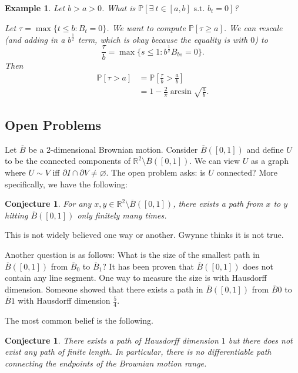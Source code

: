 \documentclass{tufte-handout}
\newcommand*\R{\mathbb{R}}
\renewcommand*\P{\mathbb{P}}
\let\O\varnothing
\newtheorem{conj}[thm]{Conjecture}
\newtheorem{ex}[thm]{Example}
\theoremstyle{definition}
\begin{document}
\begin{ex}
	Let $b > a > 0$. What is $\P\left[\exists\ t \in [a,b] \text{ s.t. } b_t = 0\right] $?

	Let $\tau = \max \{t \le b : B_t = 0\}$. We want to compute $\P\left[\tau \ge a\right] $.
	We can rescale (and adding in a $b^{\frac{1}{2}}$ term, which is okay because the equality is with $0$) to \[
		\frac{\tau}{b} = \max \{ s \le 1 : b^{\frac{1}{2}} B_{bs} = 0\}
	.\] 
	Then 
	\begin{align*}
		\P\left[\tau > a\right] &= \P\left[\frac{\tau}{b} > \frac{a}{b}\right] \\
								&= 1-\frac{2}{\pi} \arcsin{\sqrt{\frac{a}{b}} }
	.\end{align*}
\end{ex}

\subsection{Open Problems}
Let $\overline{B}$ be a 2-dimensional Brownian motion.
Consider $\overline{B}([0,1])$ and define $U$ to be the connected components of $\R^2 \setminus \overline{B}([0,1])$. We can view $U$ as a graph where $U\sim V$ iff $\partial I \cap \partial V \ne \O$. The open problem asks: is $U$ connected? More specifically, we have the following:
\begin{conj}
	For any $x,y \in \R^2 \setminus \overline{B}\left( [0,1] \right)$, there exists a path from $x$ to $y$ hitting $\overline{B}\left( [0,1] \right)$ only finitely many times. 
\end{conj}
This is not widely believed one way or another. Gwynne thinks it is not true.


Another question is as follows: What is the size of the smallest path in $\overline{B}\left( [0,1] \right)$ from $\overline{B}_0$ to $\overline{B}_1$? It has been proven that $\overline{B}\left( [0,1] \right)$ does not contain any line segment. One way to measure the size is with Hausdorff dimension. Someone showed that there exists a path in $\overline{B}\left( [0,1] \right)$ from $\overline{B}0$ to $\overline{B}1$ with Hausdorff dimension $\frac{5}{4}$.

The most common belief is the following.

\begin{conj}
	There exists a path of Hausdorff dimension $1$ but there does not exist any path of finite length. In particular, there is no differentiable path connecting the endpoints of the Brownian motion range.
\end{conj}
\end{document}

